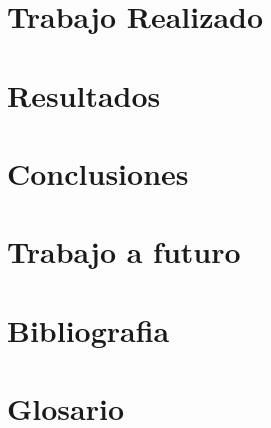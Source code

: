 \documentclass[oneside,10pt]{book}
\begin{document}
\chapter{Trabajo Realizado}


\chapter{Resultados}

\chapter{Conclusiones}

\chapter{Trabajo a futuro}

\chapter{Bibliografia}

\chapter{Glosario}


\end{document}
